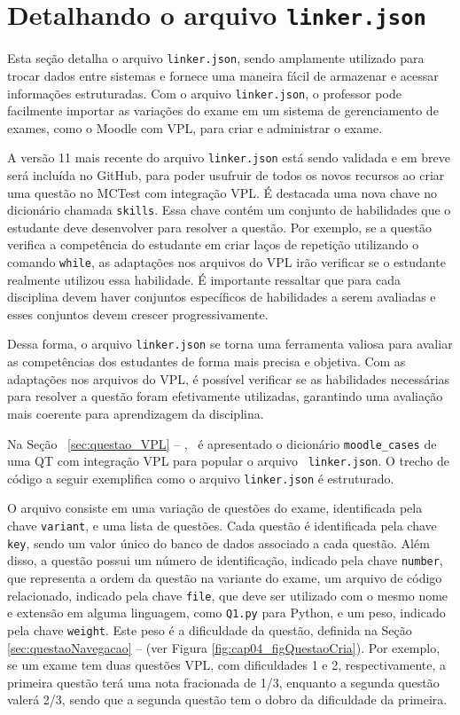 \section{Detalhando o arquivo \texttt{linker.json}}

Esta seção detalha o arquivo \verb|linker.json|, sendo amplamente utilizado para trocar dados entre sistemas e fornece uma maneira fácil de armazenar e acessar informações estruturadas. Com o arquivo \verb|linker.json|, o professor pode facilmente importar as variações do exame em um sistema de gerenciamento de exames, como o Moodle com VPL, para criar e administrar o exame.

A versão 11 mais recente do arquivo \verb|linker.json| está sendo validada e em breve será incluída no GitHub, para poder usufruir de todos os novos recursos ao criar uma questão no MCTest com integração VPL. É destacada uma nova chave no dicionário chamada \verb|skills|. Essa chave contém um conjunto de habilidades que o estudante deve desenvolver para resolver a questão. Por exemplo, se a questão verifica a competência do estudante em criar laços de repetição utilizando o comando \verb|while|, as adaptações nos arquivos do VPL irão verificar se o estudante realmente utilizou essa habilidade. É importante ressaltar que para cada disciplina devem haver conjuntos específicos de habilidades a serem avaliadas e esses conjuntos devem crescer progressivamente.

Dessa forma, o arquivo \verb|linker.json| se torna uma ferramenta valiosa para avaliar as competências dos estudantes de forma mais precisa e objetiva. Com as adaptações nos arquivos do VPL, é possível verificar se as habilidades necessárias para resolver a questão foram efetivamente utilizadas, garantindo uma avaliação mais coerente para aprendizagem da disciplina.

Na Seção \ \ref{sec:questao_VPL} -- , \ é apresentado o dicionário \verb|moodle_cases| de uma QT com integração VPL para popular o arquivo \ \verb|linker.json|. O trecho de código a seguir exemplifica como o arquivo \verb|linker.json| é estruturado.

O arquivo consiste em uma variação de questões do exame, identificada pela chave \verb|variant|, e uma lista de questões. Cada questão é identificada pela chave \verb|key|, sendo um valor único do banco de dados associado a cada questão. Além disso, a questão possui um número de identificação, indicado pela chave \verb|number|, que representa a ordem da questão na variante do exame, um arquivo de código relacionado, indicado pela chave \verb|file|, que deve ser utilizado com o mesmo nome e extensão em alguma linguagem, como \verb|Q1.py| para Python, e um peso, indicado pela chave \verb|weight|. Este peso é a dificuldade da questão, definida na Seção \ref{sec:questaoNavegacao} --  (ver Figura \ref{fig:cap04_figQuestaoCria}). Por exemplo, se um exame tem duas questões VPL, com dificuldades 1 e 2, respectivamente, a primeira questão terá uma nota fracionada de 1/3, enquanto a segunda questão valerá 2/3, sendo que a segunda questão tem o dobro da dificuldade da primeira.

